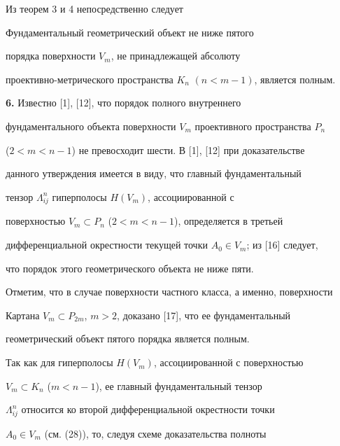  


Из теорем 3 и 4 непосредственно следует 


 


\begin{thm} 


Фундаментальный геометрический объект не ниже пятого 


порядка поверхности $V_m$, не принадлежащей абсолюту 


проективно-метрического пространства $K_n$ $(n<m-1)$, является полным. 


\end{thm} 


 


 


{\bf 6.} Известно [1], [12], что порядок полного внутреннего 


фундаментального объекта поверхности $V_m$ проективного пространства $P_n$ 


($2<m<n-1$) не превосходит шести. В [1], [12] при доказательстве 


данного утверждения имеется в виду, что главный фундаментальный 


тензор $\Lambda^n_{ij}$ гиперполосы $H(V_m)$, ассоциированной с 


поверхностью $V_m\subset P_n$ ($2<m<n-1$), определяется в третьей 


дифференциальной окрестности текущей точки $A_0\in V_m$; из [16] следует, 


что порядок этого геометрического объекта не ниже пяти. 


 


Отметим, что в случае поверхности частного класса, а именно, поверхности 


Картана $V_m\subset P_{2m}$, $m>2$, доказано [17], что ее фундаментальный 


геометрический объект пятого порядка является полным. 


 


Так как для гиперполосы $H(V_m)$, ассоциированной с поверхностью 


$V_m\subset K_n$ ($m<n-1$), ее главный фундаментальный тензор 


$\Lambda^n_{ij}$ относится ко второй дифференциальной окрестности точки 


$A_0\in V_m$ (см. (28)), то, следуя схеме доказательства полноты 


